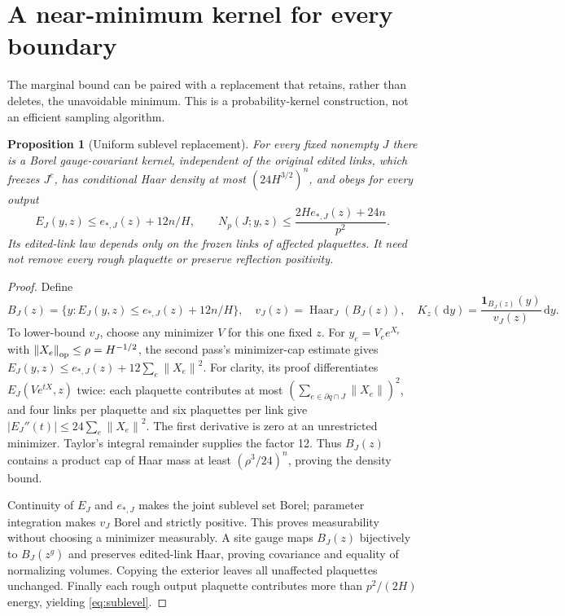\documentclass[11pt]{article}
\newtheorem{proposition}[theorem]{Proposition}
\theoremstyle{remark}
\newcommand{\one}{\mathbf 1}
\newcommand{\dd}{\,\mathrm d}
\newcommand{\norm}[1]{\left\lVert#1\right\rVert}
\begin{document}
\section{A near-minimum kernel for every boundary}
The marginal bound can be paired with a replacement that retains, rather
than deletes, the unavoidable minimum. This is a probability-kernel
construction, not an efficient sampling algorithm.

\begin{proposition}[Uniform sublevel replacement]\label{prop:sublevel}
For every fixed nonempty $J$ there is a Borel gauge-covariant kernel,
independent of the original edited links, which freezes $J^c$, has
conditional Haar density at most $(24H^{3/2})^n$, and obeys for every output
\begin{equation}
 E_J(y,z)\le e_{*,J}(z)+12n/H,\qquad
 N_p(J;y,z)\le \frac{2He_{*,J}(z)+24n}{p^2}.
 \label{eq:sublevel}
\end{equation}
Its edited-link law depends only on the frozen links of affected plaquettes.
It need not remove every rough plaquette or preserve reflection positivity.
\end{proposition}
\begin{proof}
Define
\[
 B_J(z)=\{y:E_J(y,z)\le e_{*,J}(z)+12n/H\},\quad
 v_J(z)=\operatorname{Haar}_J(B_J(z)),\quad
 K_z(\dd y)=\frac{\one_{B_J(z)}(y)}{v_J(z)}\dd y.
\]
To lower-bound $v_J$, choose any minimizer $V$ for this one fixed $z$.
For $y_e=V_e e^{X_e}$ with $\norm{X_e}_{\rm op}\le\rho=H^{-1/2}$, the
second pass's minimizer-cap estimate gives
$E_J(y,z)\le e_{*,J}(z)+12\sum_e\norm{X_e}^2$.
For clarity, its proof differentiates $E_J(Ve^{tX},z)$ twice: each
plaquette contributes at most $(\sum_{e\in\partial q\cap J}\norm{X_e})^2$,
and four links per plaquette and six plaquettes per link give
$|E_J''(t)|\le24\sum_e\norm{X_e}^2$. The first derivative is zero at
an unrestricted minimizer. Taylor's integral remainder supplies the
factor 12. Thus $B_J(z)$ contains a product cap of Haar mass at least
$(\rho^3/24)^n$, proving the density bound.

Continuity of $E_J$ and $e_{*,J}$ makes the joint sublevel set Borel;
parameter integration makes $v_J$ Borel and strictly positive. This proves
measurability without choosing a minimizer measurably. A site gauge maps
$B_J(z)$ bijectively to $B_J(z^g)$ and preserves edited-link Haar, proving
covariance and equality of normalizing volumes. Copying the exterior
leaves all unaffected plaquettes unchanged. Finally each rough output
plaquette contributes more than $p^2/(2H)$ energy, yielding
\eqref{eq:sublevel}.
\end{proof}
\end{document}
